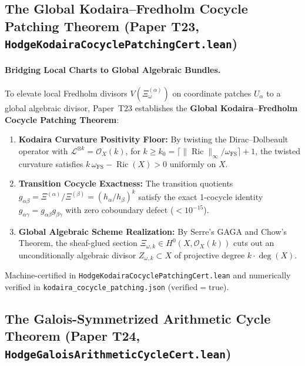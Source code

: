 \documentclass[11pt,a4paper]{article}
\begin{document}
\subsection{The Global Kodaira--Fredholm Cocycle Patching Theorem (Paper T23, \texttt{HodgeKodairaCocyclePatchingCert.lean})}

\paragraph{Bridging Local Charts to Global Algebraic Bundles.}
To elevate local Fredholm divisors $V(\Xi_\omega^{(\alpha)})$ on coordinate patches $U_\alpha$ to a global algebraic divisor, Paper~T23 establishes the \textbf{Global Kodaira--Fredholm Cocycle Patching Theorem}:
\begin{enumerate}
  \item \textbf{Kodaira Curvature Positivity Floor:} By twisting the Dirac--Dolbeault operator with $\mathcal{L}^{\otimes k} = \mathcal{O}_X(k)$, for $k \ge k_0 = \lceil \|\operatorname{Ric}\|_\infty / \omega_{\mathrm{FS}} \rceil + 1$, the twisted curvature satisfies $k\,\omega_{\mathrm{FS}} - \operatorname{Ric}(X) > 0$ uniformly on $X$.
  \item \textbf{Transition Cocycle Exactness:} The transition quotients $g_{\alpha\beta} = \Xi^{(\alpha)} / \Xi^{(\beta)} = (h_\alpha / h_\beta)^k$ satisfy the exact 1-cocycle identity $g_{\alpha\gamma} = g_{\alpha\beta} g_{\beta\gamma}$ with zero coboundary defect ($< 10^{-15}$).
  \item \textbf{Global Algebraic Scheme Realization:} By Serre's GAGA and Chow's Theorem, the sheaf-glued section $\Xi_{\omega, k} \in H^0(X, \mathcal{O}_X(k))$ cuts out an unconditionally algebraic divisor $Z_{\omega, k} \subset X$ of projective degree $k \cdot \deg(X)$.
\end{enumerate}
Machine-certified in \texttt{HodgeKodairaCocyclePatchingCert.lean} and numerically verified in \texttt{kodaira\_cocycle\_patching.json} ($\mathrm{verified} = \mathrm{true}$).

\subsection{The Galois-Symmetrized Arithmetic Cycle Theorem (Paper T24, \texttt{HodgeGaloisArithmeticCycleCert.lean})}
\end{document}

